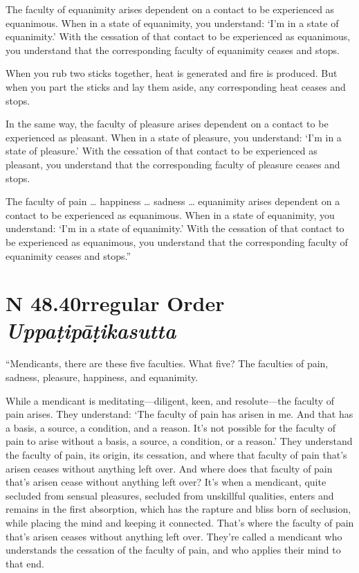 \documentclass[12pt,openany]{book}%
\newcommand*{\suttatitleacronym}[1]{\smaller[2]{#1}\vspace*{.3em}}
\newcommand*{\suttatitletranslation}[1]{\linebreak{#1}}
\newcommand*{\suttatitleroot}[1]{\linebreak\smaller[2]\itshape{#1}}
\newcommand*{\tocacronym}[1]{\hspace*{-3.3em}{#1}\quad}
\newcommand*{\toctranslation}[1]{#1}
\newcommand*{\tocroot}[1]{(\textit{#1})}
\begin{document}
The faculty of equanimity arises dependent on a contact to be experienced as equanimous. When in a state of equanimity, you understand: ‘I’m in a state of equanimity.’ With the cessation of that contact to be experienced as equanimous, you understand that the corresponding faculty of equanimity ceases and stops. 

When you rub two sticks together, heat is generated and fire is produced. But when you part the sticks and lay them aside, any corresponding heat ceases and stops. 

In the same way, the faculty of pleasure arises dependent on a contact to be experienced as pleasant. When in a state of pleasure, you understand: ‘I’m in a state of pleasure.’ With the cessation of that contact to be experienced as pleasant, you understand that the corresponding faculty of pleasure ceases and stops. 

The faculty of pain … happiness … sadness … equanimity arises dependent on a contact to be experienced as equanimous. When in a state of equanimity, you understand: ‘I’m in a state of equanimity.’ With the cessation of that contact to be experienced as equanimous, you understand that the corresponding faculty of equanimity ceases and stops.” 

%
\section*{{\suttatitleacronym SN 48.40}{\suttatitletranslation Irregular Order }{\suttatitleroot Uppaṭipāṭikasutta}}
\addcontentsline{toc}{section}{\tocacronym{SN 48.40} \toctranslation{Irregular Order } \tocroot{Uppaṭipāṭikasutta}}

“Mendicants, there are these five faculties. What five? The faculties of pain, sadness, pleasure, happiness, and equanimity. 

While a mendicant is meditating—diligent, keen, and resolute—the faculty of pain arises. They understand: ‘The faculty of pain has arisen in me. And that has a basis, a source, a condition, and a reason. It’s not possible for the faculty of pain to arise without a basis, a source, a condition, or a reason.’ They understand the faculty of pain, its origin, its cessation, and where that faculty of pain that’s arisen ceases without anything left over. And where does that faculty of pain that’s arisen cease without anything left over? It’s when a mendicant, quite secluded from sensual pleasures, secluded from unskillful qualities, enters and remains in the first absorption, which has the rapture and bliss born of seclusion, while placing the mind and keeping it connected. That’s where the faculty of pain that’s arisen ceases without anything left over. They’re called a mendicant who understands the cessation of the faculty of pain, and who applies their mind to that end. 
\end{document}
